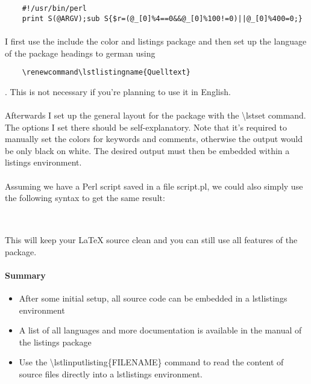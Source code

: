   \renewcommand\lstlistingname{Quelltext} %
  \begin{lstlisting}
    #!/usr/bin/perl
    print S(@ARGV);sub S{$r=(@_[0]%4==0&&@_[0]%100!=0)||@_[0]%400=0;}
  \end{lstlisting}

  \paragraph{}
  I first use the include the color and listings 
  package and then set up the language of the 
  package headings to german using 
  \begin{verbatim}
    \renewcommand\lstlistingname{Quelltext}  
  \end{verbatim}
  . This is not necessary if you're planning to use it in English.
  \paragraph{}
  Afterwards I set up the general layout for the package with the \textbackslash lstset command. The options I set there should be self-explanatory. Note that it's required to manually set the colors for keywords and comments, otherwise the output would be only black on white. The desired output must then be embedded within a listings environment.
  \paragraph{}
  Assuming we have a Perl script saved in a file script.pl, we could also simply use the following syntax to get the same result:
  \begin{lstlisting}
    
  \end{lstlisting}
  \paragraph{}
  This will keep your LaTeX source clean and you can still use all features of the package.
  
  \paragraph{Summary}
    \begin{itemize} %
      \item After some initial setup, all source code can be embedded in a lstlistings environment
      \item A list of all languages and more documentation is available in the manual of the listings package
      \item Use the \textbackslash lstlinputlisting\{FILENAME\} command to read the content of source files directly into a lstlistings environment.
    \end{itemize} 